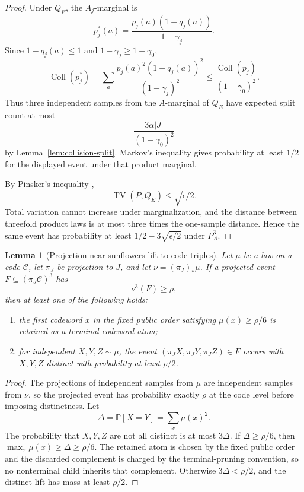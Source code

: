 \documentclass[11pt]{article}
\newtheorem{lemma}[theorem]{Lemma}
\newcommand{\C}{\mathcal C}
\newcommand{\Prb}{\mathbb P}
\newcommand{\Coll}{\operatorname{Coll}}
\begin{document}
\begin{proof}
Under $Q_E$, the $A_j$-marginal is
\[
  p_j^*(a)=\frac{p_j(a)(1-q_j(a))}{1-\gamma_j}.
\]
Since $1-q_j(a)\le 1$ and $1-\gamma_j\ge 1-\gamma_0$,
\[
  \Coll(p_j^*)=\sum_a \frac{p_j(a)^2(1-q_j(a))^2}{(1-\gamma_j)^2}
  \le
  \frac{\Coll(p_j)}{(1-\gamma_0)^2}.
\]
Thus three independent samples from the $A$-marginal of $Q_E$ have expected
split count at most
\[
  \frac{3\alpha |J|}{(1-\gamma_0)^2}
\]
by Lemma~\ref{lem:collision-split}.  Markov's inequality gives probability at
least $1/2$ for the displayed event under that product marginal.

By Pinsker's inequality \cite{Pinsker64,CoverThomas06,CsiszarKorner11},
\[
  \operatorname{TV}(P,Q_E)\le \sqrt{\epsilon/2}.
\]
Total variation cannot increase under marginalization, and the distance
between threefold product laws is at most three times the one-sample
distance.  Hence the same event has probability at least
$1/2-3\sqrt{\epsilon/2}$ under $P_A^3$.
\end{proof}

\begin{lemma}[Projection near-sunflowers lift to code triples]
\label{lem:projection-lift}
Let $\mu$ be a law on a code $\C$, let $\pi_J$ be projection to $J$, and let
$\nu=(\pi_J)_*\mu$.  If a projected event $F\subseteq(\pi_J\C)^3$ has
\[
  \nu^3(F)\ge \rho,
\]
then at least one of the following holds:
\begin{enumerate}[label=\textup{(\roman*)}]
\item the first codeword $x$ in the fixed public order satisfying
$\mu(x)\ge \rho/6$ is retained as a terminal codeword atom;
\item for independent $X,Y,Z\sim\mu$, the event
$(\pi_JX,\pi_JY,\pi_JZ)\in F$ occurs with $X,Y,Z$ distinct with probability
at least $\rho/2$.
\end{enumerate}
\end{lemma}

\begin{proof}
The projections of independent samples from $\mu$ are independent samples
from $\nu$, so the projected event has probability exactly $\rho$ at the code
level before imposing distinctness.  Let
\[
  \Delta=\Prb[X=Y]=\sum_x\mu(x)^2.
\]
The probability that $X,Y,Z$ are not all distinct is at most $3\Delta$.  If
$\Delta\ge\rho/6$, then $\max_x\mu(x)\ge \Delta\ge\rho/6$.  The retained atom
is chosen by the fixed public order and the discarded complement is charged by
the terminal-pruning convention, so no nonterminal child inherits that
complement.  Otherwise $3\Delta<\rho/2$, and the distinct lift has mass at
least $\rho/2$.
\end{proof}
\end{document}
